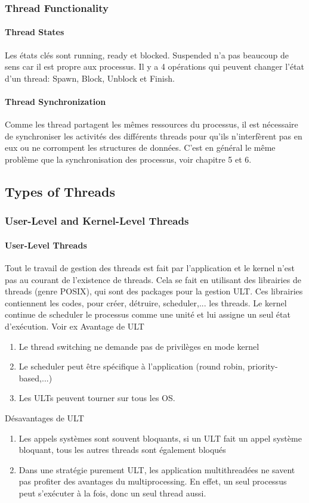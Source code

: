 \subsubsection{Thread Functionality}
\paragraph{Thread States}
Les états clés sont running, ready et blocked. Suspended n'a pas beaucoup de sens car il est propre aux processus. Il y a 4 opérations qui peuvent changer l'état d'un thread: Spawn, Block, Unblock et Finish.

\paragraph{Thread Synchronization}
Comme les thread partagent les mêmes ressources du processus, il est nécessaire de synchroniser les activités des différents threads pour qu'ils n'interfèrent pas en eux ou ne corrompent les structures de données. C'est en général le même problème que la synchronisation des processus, voir chapitre 5 et 6.

\subsection{Types of Threads}
\subsubsection{User-Level and Kernel-Level Threads}
\paragraph{User-Level Threads}
Tout le travail de gestion des threads est fait par l'application et le kernel n'est pas au courant de l'existence de threads. Cela se fait en utilisant des librairies de threads (genre POSIX), qui sont des packages pour la gestion ULT. Ces librairies contiennent les codes, pour créer, détruire, scheduler,... les threads. Le kernel continue de scheduler le processus comme une unité et lui assigne un seul état d'exécution. Voir ex \cite[p.~186]{stallings} Avantage de ULT
\begin{enumerate}
  \item Le thread switching ne demande pas de privilèges en mode kernel
  \item Le scheduler peut être spécifique à l'application (round robin, priority-based,...)
  \item Les ULTs peuvent tourner sur tous les OS.
\end{enumerate}
Désavantages de ULT
\begin{enumerate}
  \item Les appels systèmes sont souvent bloquants, si un ULT fait un appel système bloquant, tous les autres threads sont également bloqués
  \item Dans une stratégie purement ULT, les application multithreadées ne savent pas profiter des avantages du multiprocessing. En effet, un seul processus peut s'exécuter à la fois, donc un seul thread aussi.
\end{enumerate}
